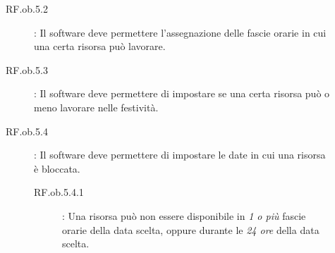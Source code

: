 \begin{description}
\begin{description}
\begin{description}
		\end{description}
	\item[RF.ob.5.2]: Il software deve permettere l\textquoteright{}assegnazione delle fascie orarie in cui una certa risorsa pu\`{o} lavorare.
	\item[RF.ob.5.3]: Il software deve permettere di impostare se una certa risorsa pu\`{o} o meno lavorare nelle festivit\`{a}.
	\item[RF.ob.5.4]: Il software deve permettere di impostare le date in cui una risorsa \`{e} bloccata.
		\begin{description}
		\item[RF.ob.5.4.1]: Una risorsa pu\`{o} non essere disponibile in \textit{1 o pi\`{u}} fascie orarie della data scelta, oppure durante le \textit{24 ore} della data scelta.
		\end{description}
	\end{description}
\end{description}